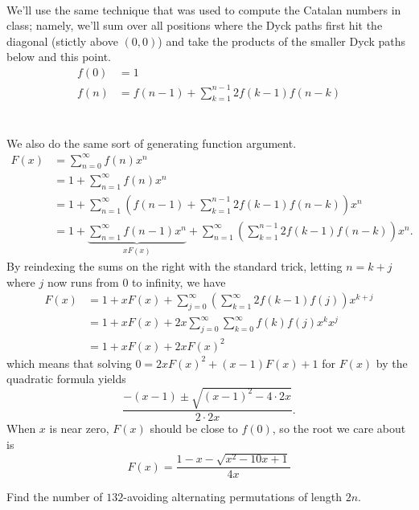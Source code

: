 \documentclass{article}
\newenvironment{problem}[2][Problem]{\begin{trivlist}
\item[\hskip \labelsep {\bfseries #1}\hskip \labelsep {\bfseries #2.}]}{\end{trivlist}}
\newenvironment{solution}[1][Solution.]{\begin{trivlist}
\item[\hskip \labelsep {\bfseries #1}]}{\end{trivlist}}
\begin{document}
\begin{solution} \text{} \\
  We'll use the same technique that was used to compute the Catalan numbers in
  class; namely, we'll sum over all positions where the Dyck paths first hit the
  diagonal (stictly above $(0, 0)$) and take the products of the smaller Dyck
  paths below and this point.
  \begin{align*}
    f(0) &= 1 \\
    f(n) &= f(n - 1) + \sum_{k=1}^{n - 1}2f(k-1)f(n-k)
  \end{align*}
  \\~\\
  We also do the same sort of generating function argument. \begin{align*}
    F(x) &= \sum_{n=0}^\infty f(n)x^n \\
         &= 1 + \sum_{n=1}^\infty f(n)x^n \\
         &= 1 + \sum_{n=1}^\infty \left(f(n - 1) + \sum_{k=1}^{n - 1}2f(k-1)f(n-k)\right)x^n \\
         &= 1 + \underbrace{\sum_{n=1}^\infty f(n - 1)x^n}_{xF(x)} + \sum_{n=1}^\infty\left(\sum_{k=1}^{n - 1}2f(k-1)f(n-k)\right)x^n.
  \end{align*}
  By reindexing the sums on the right with the standard trick, letting
  $n = k + j$ where $j$ now runs from $0$ to infinity, we have
  \begin{align*}
    F(x) &= 1 + xF(x) + \sum_{j=0}^\infty\left(\sum_{k=1}^{\infty}2f(k-1)f(j)\right)x^{k + j} \\
    &= 1 + xF(x) + 2x\sum_{j=0}^\infty\sum_{k=0}^{\infty}f(k)f(j)x^k x^j \\
    &= 1 + xF(x) + 2xF(x)^2
  \end{align*}
  which means that solving $0 = 2xF(x)^2 + (x - 1)F(x) + 1$ for $F(x)$ by the
  quadratic formula yields \[
    \frac{-(x - 1) \pm \sqrt{(x - 1)^2 - 4\cdot2x}}{2\cdot 2x}.
  \] When $x$ is near zero, $F(x)$ should be close to $f(0)$, so the root we
  care about is \[
    F(x) = \frac{1 - x - \sqrt{x^2 - 10x + 1}}{4x}
  \]
\end{solution}
\pagebreak
\begin{problem}{3}
  Find the number of $132$-avoiding alternating permutations of length $2n$.
\end{problem}
\end{document}
